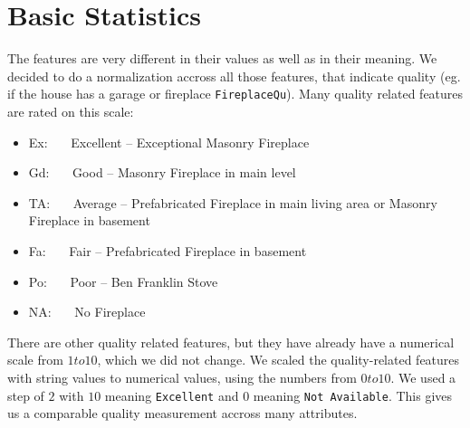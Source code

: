 \section{Basic Statistics}

The features are very different in their values as well as in their meaning. We decided to do a normalization accross all those features, that indicate quality (eg. if the house has a garage or fireplace \texttt{FireplaceQu}). Many quality related features are rated on this scale:

\begin{itemize}
    \item Ex:~~~ Excellent -- Exceptional Masonry Fireplace
    \item Gd:~~~ Good -- Masonry Fireplace in main level
    \item TA:~~~ Average -- Prefabricated Fireplace in main living area or Masonry Fireplace in basement
    \item Fa:~~~ Fair -- Prefabricated Fireplace in basement
    \item Po:~~~ Poor -- Ben Franklin Stove
    \item NA:~~~ No Fireplace
\end{itemize}

There are other quality related features, but they have already have a numerical scale from $1 to 10$, which we did not change. We scaled the quality-related features with string values to numerical values, using the numbers from $0 to 10$. We used a step of $2$ with $10$ meaning \texttt{Excellent} and $0$ meaning \texttt{Not Available}. This gives us a comparable quality measurement accross many attributes.